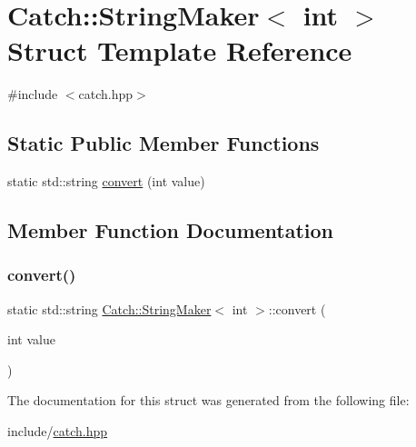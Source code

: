 \hypertarget{struct_catch_1_1_string_maker_3_01int_01_4}{}\section{Catch\+::String\+Maker$<$ int $>$ Struct Template Reference}
\label{struct_catch_1_1_string_maker_3_01int_01_4}


{\ttfamily \#include $<$catch.\+hpp$>$}

\subsection*{Static Public Member Functions}
\begin{DoxyCompactItemize}
\item 
static std\+::string \mbox{\hyperlink{struct_catch_1_1_string_maker_3_01int_01_4_aab096e55fb7283f6ad47b5ca277e22e8}{convert}} (int value)
\end{DoxyCompactItemize}


\subsection{Member Function Documentation}
\mbox{\label{struct_catch_1_1_string_maker_3_01int_01_4_aab096e55fb7283f6ad47b5ca277e22e8}} 
\subsubsection{\texorpdfstring{convert()}{convert()}}
{\footnotesize\ttfamily static std\+::string \mbox{\hyperlink{struct_catch_1_1_string_maker}{Catch\+::\+String\+Maker}}$<$ int $>$\+::convert (\begin{DoxyParamCaption}\item[{int}]{value }\end{DoxyParamCaption})\hspace{0.3cm}{\ttfamily [static]}}



The documentation for this struct was generated from the following file\+:\begin{DoxyCompactItemize}
\item 
include/\mbox{\hyperlink{catch_8hpp}{catch.\+hpp}}\end{DoxyCompactItemize}
